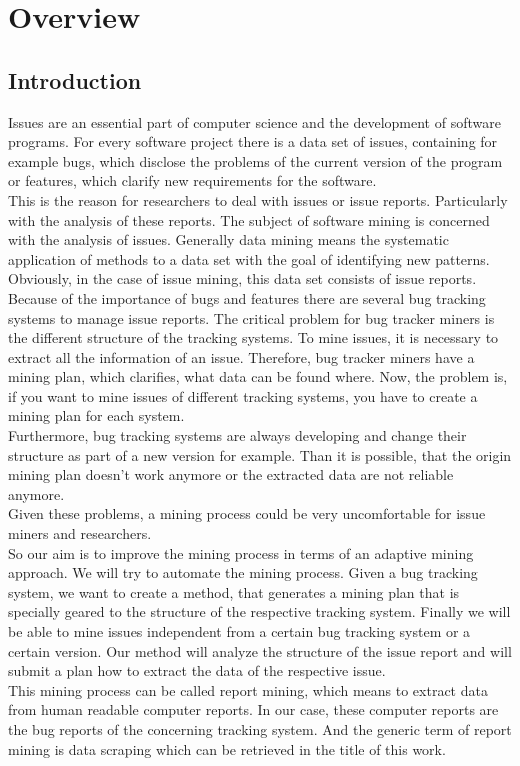 \chapter{Overview}
\label{Overview}

\section{Introduction}
\label{Introduction}
Issues are an essential part of computer science and the development of software programs. For every software project there is a data set of issues, containing for example bugs, which disclose the problems of the current version of the program or features, which clarify new requirements for the software. \\ This is the reason for researchers to deal with issues or issue reports. Particularly with the analysis of these reports. The subject of software mining is concerned with the analysis of issues. Generally data mining means the systematic application of methods to a data set with the goal of identifying new patterns. Obviously, in the case of issue mining, this data set consists of issue reports. \\ Because of the importance of bugs and features there are several bug tracking systems to manage issue reports.
The critical problem for bug tracker miners is the different structure of the tracking systems. To mine issues, it is necessary to extract all the information of an issue. Therefore, bug tracker miners have a mining plan, which clarifies, what data can be found where. Now, the problem is, if you want to mine issues of different tracking systems, you have to create a mining plan for each system. \\ Furthermore, bug tracking systems are always developing and change their structure as part of a new version for example.
Than it is possible, that the origin mining plan doesn't work anymore or the extracted data are not reliable anymore. \\ Given these problems, a mining process could be very uncomfortable for issue miners and researchers. \\ So our aim is to improve the mining process in terms of an adaptive mining approach. We will try to automate the mining process. Given a bug tracking system, we want to create a method, that generates a mining plan that is specially geared to the structure of the respective tracking system. Finally we will be able to mine issues independent from a certain bug tracking system or a certain version. Our method will analyze the structure of the issue report and will submit a plan how to extract the data of the respective issue. \\ This mining process can be called report mining, which means to extract data from human readable computer reports. In our case, these computer reports are the bug reports of the concerning tracking system. And the generic term of report mining is data scraping which can be retrieved in the title of this work.
